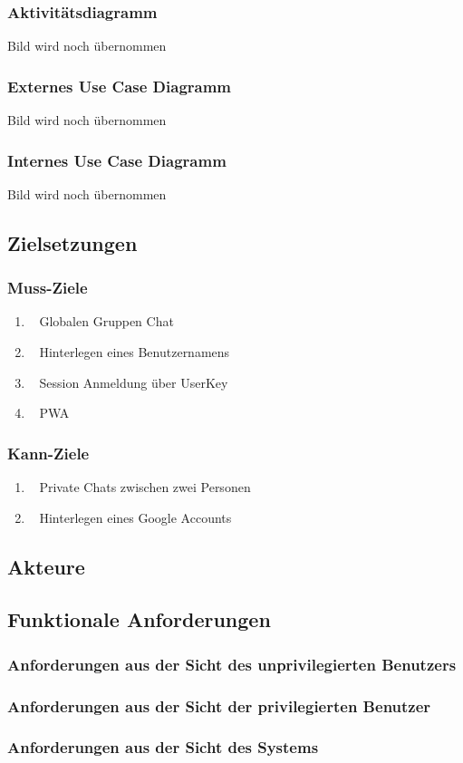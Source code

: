 \documentclass[12pt]{article}
\begin{document}
      \subsubsection{Aktivitätsdiagramm}
        Bild wird noch übernommen
      \subsubsection{Externes Use Case Diagramm}
        Bild wird noch übernommen
      \subsubsection{Internes Use Case Diagramm}
        Bild wird noch übernommen

    \subsection{Zielsetzungen}
      \subsubsection{Muss-Ziele}
        \begin{enumerate}
          \item \faGlobe~ Globalen Gruppen Chat
          \item \faUser~ Hinterlegen eines Benutzernamens
          \item \faKey~ Session Anmeldung über UserKey
          \item \faMobile~ PWA
        \end{enumerate}

      \subsubsection{Kann-Ziele}
        \begin{enumerate}
          \item \faUsers~ Private Chats zwischen zwei Personen
          \item \faGoogle~ Hinterlegen eines Google Accounts
        \end{enumerate}

    \subsection{Akteure}

    \subsection{Funktionale Anforderungen}
      \subsubsection{Anforderungen aus der Sicht des unprivilegierten Benutzers}
      \subsubsection{Anforderungen aus der Sicht der privilegierten Benutzer}
      \subsubsection{Anforderungen aus der Sicht des Systems}
\end{document}
